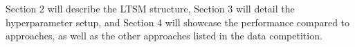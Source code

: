 \documentclass[conference]{IEEEtran}
\begin{document}

Section 2 will describe the LTSM structure, Section 3 will detail the hyperparameter setup, and Section 4 will showcase the performance compared to approaches, as well as the other approaches listed in the data competition.





% 

\end{document}
